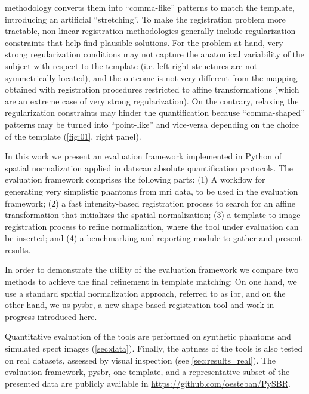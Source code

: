 \documentclass{frontiers}
\newcommand{\fixme}[1]{}
\newcommand{\fixme}[1]{{\color{red}{\bf FIXME: }\emph{#1}}}
\begin{document}
  methodology converts them into ``comma-like'' patterns to match the template,
  introducing an artificial ``stretching''.
To make the registration problem more tractable, non-linear registration 
  methodologies generally include regularization constraints that help
  find plausible solutions.
For the problem at hand, very strong regularization conditions may not 
  capture the anatomical variability of the subject with respect to the 
  template (i.e. left-right structures are not symmetrically located),
  and the outcome is not very different from the mapping
  obtained with registration procedures restricted to affine
  transformations (which are an extreme case of very strong
  regularization).
On the contrary, relaxing the regularization constraints may hinder the quantification 
  because ``comma-shaped'' patterns may be turned into ``point-like'' and vice-versa
  depending on the choice of the template (\autoref{fig:01}, right panel).

\fixme{These parts must be re-written almost at full.}
{\color{red}
In this work we present an evaluation framework implemented in Python of spatial normalization
  applied in \gls*{datscan} absolute quantification protocols.
The evaluation framework comprises the following parts: 
(1) A workflow for generating very simplistic phantoms from
   \gls*{mri} data, to be used in the evaluation framework;
(2) a fast intensity-based registration process to search for an affine
   transformation that initializes the spatial normalization;
(3) a template-to-image registration process to refine normalization,
   where the tool under evaluation can be inserted; and
(4) a benchmarking and reporting module to gather and present results.

\cbstart
In order to demonstrate the utility of the evaluation framework we compare 
  two methods to achieve the final refinement in template matching: 
On one hand, we use a standard spatial normalization 
  approach,  referred to as \gls*{ibr}, 
  and on the other hand, we us \gls*{pysbr}, a new shape based registration tool and 
  work in progress introduced here.   
\cbend

Quantitative evaluation of the tools are performed on synthetic
  phantoms and simulated \gls*{spect} images (\autoref{sec:data}).
Finally, the aptness of the tools is also tested on real datasets,
  assessed by visual inspection (see \autoref{sec:results_real}).
The evaluation framework, \gls*{pysbr}, one template,
  and a representative subset of the presented data are publicly 
  available in \url{https://github.com/oesteban/PySBR}.
  }
\end{document}
